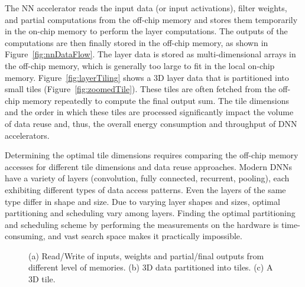 \documentclass[a4paper,10pt]{article}
\begin{document}
The NN accelerator reads the input data (or input activations), filter weights, and partial computations from the off-chip memory and stores them temporarily in the on-chip memory to perform the layer computations. The outputs of the computations are then finally stored in the off-chip memory, as shown in Figure~\ref{fig:nnDataFlow}. The layer data is stored as multi-dimensional arrays in the off-chip memory, which is generally too large to fit in the local on-chip memory. Figure~\ref{fig:layerTiling} shows a 3D layer data that is partitioned into small tiles (Figure~\ref{fig:zoomedTile}). These tiles are often fetched from the off-chip memory repeatedly to compute the final output sum. The tile dimensions and the order in which these tiles are processed significantly impact the volume of data reuse and, thus, the overall energy consumption and throughput of DNN accelerators. 

Determining the optimal tile dimensions requires comparing the off-chip memory accesses for different tile dimensions and data reuse approaches. Modern DNNs have a variety of layers (convolution, fully connected, recurrent, pooling), each exhibiting different types of data access patterns. Even the layers of the same type differ in shape and size. Due to varying layer shapes and sizes, optimal partitioning and scheduling vary among layers. Finding the optimal partitioning and scheduling scheme by performing the measurements on the hardware is time-consuming, and vast search space makes it practically impossible.
\begin{figure}[!htb]
	\centering
    \captionsetup{font=sf}
	\hfil	
	\hfil
   \hfil	
	\caption{(a) Read/Write of inputs, weights and partial/final outputs from different level of memories. (b) 3D data partitioned into tiles. (c) A 3D tile.}
	\label{fig:nnLayerData}
\end{figure}
\end{document}
